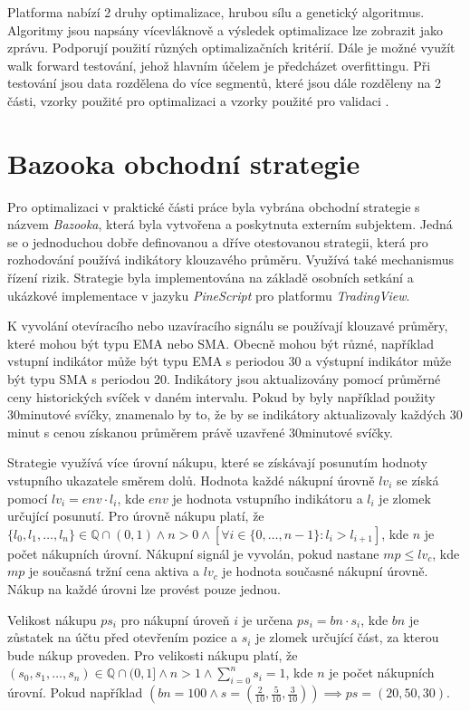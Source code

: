 Platforma nabízí 2 druhy optimalizace, hrubou sílu a genetický algoritmus.
Algoritmy jsou napsány vícevláknově a výsledek optimalizace lze zobrazit jako zprávu.
Podporují použití různých optimalizačních kritérií.
Dále je možné využít walk forward testování, jehož hlavním účelem je předcházet overfittingu.
Při testování jsou data rozdělena do více segmentů, které jsou dále rozděleny na 2 části, vzorky použité pro optimalizaci a vzorky použité pro validaci \cite{multicharts}.

\section{Bazooka obchodní strategie}
Pro optimalizaci v praktické části práce byla vybrána obchodní strategie s názvem \textit{Bazooka}, která byla vytvořena a poskytnuta externím subjektem.
Jedná se o jednoduchou dobře definovanou a dříve otestovanou strategii, která pro rozhodování používá indikátory klouzavého průměru.
Využívá také mechanismus řízení rizik.
Strategie byla implementována na základě osobních setkání a ukázkové implementace v jazyku \textit{PineScript} pro platformu \textit{TradingView}.

K vyvolání otevíracího nebo uzavíracího signálu se používají klouzavé průměry, které mohou být typu EMA nebo SMA.
Obecně mohou být různé, například vstupní indikátor může být typu EMA s periodou 30 a výstupní indikátor může být typu SMA s periodou 20.
Indikátory jsou aktualizovány pomocí průměrné ceny historických svíček v daném intervalu.
Pokud by byly například použity 30minutové svíčky, znamenalo by to, že by se indikátory aktualizovaly každých 30 minut s cenou získanou průměrem právě uzavřené 30minutové svíčky.

Strategie využívá více úrovní nákupu, které se získávají posunutím hodnoty vstupního ukazatele směrem dolů.
Hodnota každé nákupní úrovně $lv_i$ se získá pomocí $lv_i=env \cdot l_i$, kde $env$ je hodnota vstupního indikátoru a $l_i$ je zlomek určující posunutí.
Pro úrovně nákupu platí, že $\{l_0, l_1,\dots,l_n\} \in \mathbb{Q} \cap (0, 1) \land n>0 \land [\forall i \in \{0,\dots,n-1\} : l_i > l_{i+1}]$, kde $n$ je počet nákupních úrovní.
Nákupní signál je vyvolán, pokud nastane $mp\leq lv_c$, kde $mp$ je současná tržní cena aktiva a $lv_c$ je hodnota současné nákupní úrovně.
Nákup na každé úrovni lze provést pouze jednou.

Velikost nákupu $ps_i$ pro nákupní úroveň $i$ je určena $ps_i=bn \cdot s_i$, kde $bn$ je zůstatek na účtu před otevřením pozice a $s_i$ je zlomek určující část, za kterou bude nákup proveden.
Pro velikosti nákupu platí, že $ (s_0, s_1,\dots,s_n) \in \mathbb{Q} \cap (0, 1] \land n>1 \land \sum_{i=0}^{n} s_i = 1 $, kde $n$ je počet nákupních úrovní.
Pokud například $(bn=100 \land s = (\frac{2}{10}, \frac{5}{10}, \frac{3}{10}))\implies ps=(20, 50, 30)$.

